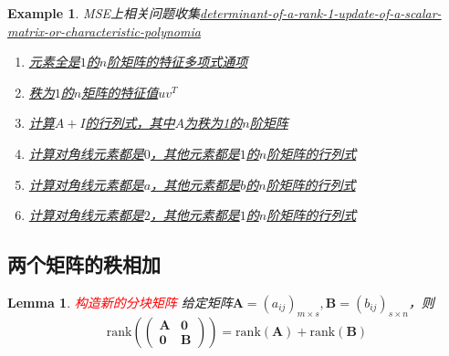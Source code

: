 \documentclass{article}
\newtheorem{lemma}[theorem]{Lemma}
\newtheorem{example}[theorem]{Example}
\newcommand{\mbf}[1]{\bm{#1}}
\newcommand{\rank}[1]{\text{rank}\left(#1\right)} %
\newcommand{\redt}[1]{\textcolor{red}{#1}}
\begin{document}
\begin{example}
\rm MSE上相关问题收集\href{https://math.stackexchange.com/questions/904926/determinant-of-a-rank-1-update-of-a-scalar-matrix-or-characteristic-polynomia}{determinant-of-a-rank-1-update-of-a-scalar-matrix-or-characteristic-polynomia}
\begin{enumerate}
	\item \href{https://math.stackexchange.com/q/153457/18880}{元素全是$1$的$n$阶矩阵的特征多项式通项}
	\item \href{https://math.stackexchange.com/q/55165/18880}{秩为$1$的$n$矩阵的特征值$uv^T$}
	\item \href{https://math.stackexchange.com/q/577937/18880}{计算$A+I$的行列式，其中$A$为秩为1的$n$阶矩阵}
	\item \href{https://math.stackexchange.com/q/84206/18880}{计算对角线元素都是$0$，其他元素都是$1$的$n$阶矩阵的行列式}
	\item \href{https://math.stackexchange.com/q/86644/18880}{计算对角线元素都是$a$，其他元素都是$b$的$n$阶矩阵的行列式}
	\item \href{https://math.stackexchange.com/questions/629892/determinant-of-a-special-n-times-n-matrix}{计算对角线元素都是$2$，其他元素都是$1$的$n$阶矩阵的行列式}
\end{enumerate}
\end{example}

\subsection{两个矩阵的秩相加}

\begin{lemma}
\rm \redt{构造新的分块矩阵} 给定矩阵$\mbf{A}=(a_{ij})_{m \times s},\mbf{B}=(b_{ij})_{s \times n}$，则
$$
\rank{\begin{pmatrix}
\mbf{A} & \mbf{0} \\
\mbf{0}	& \mbf{B} 
\end{pmatrix}} = \rank{\mbf{A}}+\rank{\mbf{B}}
$$
\end{lemma}
\end{document}

